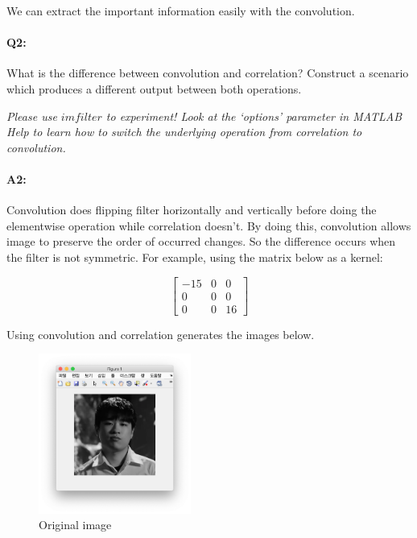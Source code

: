 	We can extract the important information easily with the convolution.
	
	
	
	\pagebreak
	\paragraph{Q2:} What is the difference between convolution and correlation? Construct a scenario which produces a different output between both operations.
	
	\emph{Please use \href{https://www.mathworks.com/help/images/ref/imfilter.html}{$imfilter$} to experiment! Look at the `options' parameter in MATLAB Help to learn how to switch the underlying operation from correlation to convolution.}
	
	\paragraph{A2:} Convolution does flipping filter horizontally and vertically before doing the elementwise operation while correlation doesn't. By doing this, convolution allows image to preserve the order of occurred changes. So the difference occurs when the filter is not symmetric.
	For example, using the matrix below as a kernel:

	\begin{equation*}
		\begin{bmatrix}
			-15 & 0 & 0 \\
			0 & 0 & 0 \\
			0 & 0 & 16
		\end{bmatrix}
	\end{equation*}
	
	Using convolution and correlation generates the images below.
	\begin{figure}[h]
		\centering
		\includegraphics[width=5cm]{maru_origin.png}
		\caption{Original image}
		\label{fig:original image}
	\end{figure}

